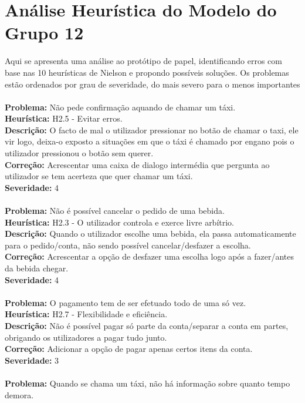 \documentclass{article}
\begin{document}
\section*{Análise Heurística do Modelo do Grupo 12}
Aqui se apresenta uma análise ao protótipo de papel, identificando erros com base nas 10 heurísticas de Nielson e propondo possíveis soluções. Os problemas estão ordenados por grau de severidade, do mais severo para o menos importantes\\
\\
\textbf{Problema:} Não pede confirmação aquando de chamar um táxi.\\
\textbf{Heurística:} H2.5 - Evitar erros.\\
\textbf{Descrição:} O facto de mal o utilizador pressionar no botão de chamar o taxi, ele vir logo, deixa-o exposto a situações em que o táxi é chamado por engano pois o utilizador pressionou o botão sem querer.\\
\textbf{Correção:} Acrescentar uma caixa de dialogo intermédia que pergunta ao utilizador se tem acerteza que quer chamar um táxi.\\
\textbf{Severidade:} 4\\
\\
\textbf{Problema:} Não é possível cancelar o pedido de uma bebida.\\
\textbf{Heurística:} H2.3 - O utilizador controla e exerce livre arbítrio.\\
\textbf{Descrição:} Quando o utilizador escolhe uma bebida, ela passa automaticamente para o pedido/conta, não sendo possível cancelar/desfazer a escolha.\\
\textbf{Correção:} Acrescentar a opção de desfazer uma escolha logo após a fazer/antes da bebida chegar.\\
\textbf{Severidade:} 4\\
\\
\textbf{Problema:} O pagamento tem de ser efetuado todo de uma só vez.\\
\textbf{Heurística:} H2.7 - Flexibilidade e eficiência.\\
\textbf{Descrição:} Não é possível pagar só parte da conta/separar a conta em partes, obrigando os utilizadores a pagar tudo junto.\\
\textbf{Correção:} Adicionar a opção de pagar apenas certos itens da conta.\\
\textbf{Severidade:} 3\\
\\
\textbf{Problema:} Quando se chama um táxi, não há informação sobre quanto tempo demora.\\
\end{document}
